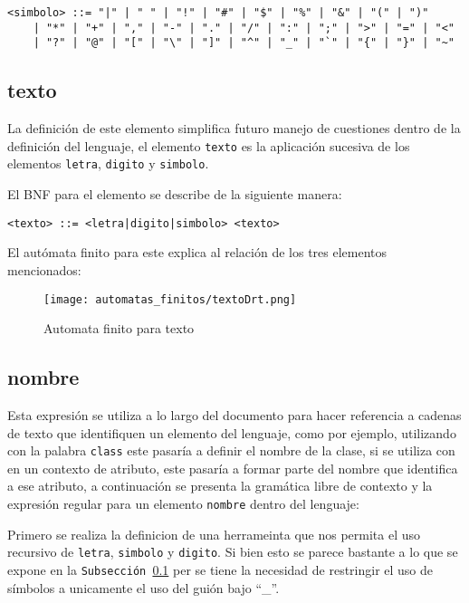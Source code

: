 \begin{lstlisting}[basicstyle=\footnotesize\ttfamily]
	<simbolo> ::= "|" | " " | "!" | "#" | "$" | "%" | "&" | "(" | ")"
	| "*" | "+"	| "," | "-" | "." | "/" | ":" | ";" | ">" | "=" | "<"
	| "?" | "@" | "[" | "\"	| "]" | "^" | "_" | "`" | "{" | "}" | "~"
\end{lstlisting}


\subsection{texto}
\label{sub:texto}
La definición de este elemento simplifica futuro manejo de cuestiones dentro de
la definición del lenguaje, el elemento \texttt{texto} es la aplicación
sucesiva de los elementos \texttt{letra}, \texttt{digito} y \texttt{simbolo}.

El BNF para el elemento se describe de la siguiente manera:

\begin{lstlisting}[basicstyle=\footnotesize\ttfamily]
  <texto> ::= <letra|digito|simbolo> <texto>
\end{lstlisting}

El autómata finito para este explica al relación de los tres elementos
mencionados:

\begin{figure}[H]
	\centering
	\texttt{[image: automatas\_finitos/textoDrt.png]}
	\caption{Automata finito para texto}
	\label{fig:texto}
\end{figure}

\subsection{nombre}
\label{sub:nombre}
Esta expresión se utiliza a lo largo del documento para hacer referencia a
cadenas de texto que identifiquen un elemento del lenguaje, como por ejemplo,
utilizando con la palabra \texttt{class} este pasaría a definir el nombre de la
clase, si se utiliza con en un contexto de atributo, este pasaría a formar
parte del nombre que identifica a ese atributo, a continuación se presenta la
gramática libre de contexto y la expresión regular para un elemento
\texttt{nombre} dentro del lenguaje:

Primero se realiza la definicion de una herrameinta que nos permita el uso
recursivo de \texttt{letra}, \texttt{simbolo} y \texttt{digito}. Si bien esto
se parece bastante a lo que se expone en la \texttt{Subsección \ref{sub:texto}}
per se tiene la necesidad de restringir el uso de símbolos a unicamente el uso
del guión bajo ``\_''.

